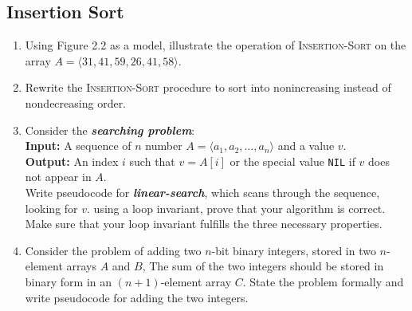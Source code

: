 \documentclass[Chapter02]{subfiles}
\begin{document}
	\subsection{Insertion Sort}

	\begin{enumerate}[leftmargin=\labelsep]
		\item Using Figure 2.2 as a model, illustrate the operation of \textsc{Insertion-Sort} on the array $A = \langle 31, 41, 59, 26, 41, 58 \rangle$.
		\begin{answer}
			
		\end{answer}

		\item Rewrite the \textsc{Insertion-Sort} procedure to sort into nonincreasing instead of nondecreasing order.
		\begin{answer}
			
		\end{answer}

		\item Consider the \textbf{\textit{searching problem}}:\\[.5em]
		\textbf{Input:} A sequence of $n$ number $A = \langle a_1, a_2, \dots, a_n \rangle$ and a value $v$.\\[.5em]
		\textbf{Output:} An index $i$ such that $v = A[i]$ or the special value \texttt{NIL} if $v$ does not appear in $A$.\\[.5em]
		Write pseudocode for \textbf{\textit{linear-search}}, which scans through the sequence, looking for $v$. using a loop invariant, prove that your algorithm is correct. Make sure that your loop invariant fulfills the three necessary properties.
		\begin{answer}
			
		\end{answer}

		\item Consider the problem of adding two $n$-bit binary integers, stored in two $n$-element arrays $A$ and $B$, The sum of the two integers should be stored in binary form in an $(n + 1)$-element array $C$. State the problem formally and write pseudocode for adding the two integers.
		\begin{answer}
			
		\end{answer}
	\end{enumerate}
\end{document}
